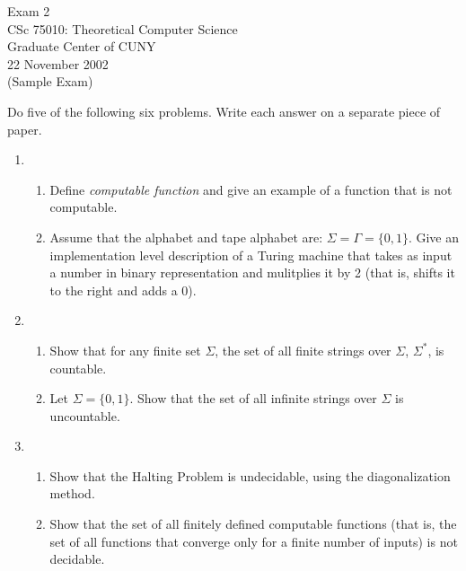 \documentclass[11pt]{article}
\begin{document}
\begin{center}
	Exam 2\\
        	CSc 75010: Theoretical Computer Science\\
        	Graduate Center of CUNY\\
	22 November 2002\\
        	(Sample Exam)
\end{center}

Do five of the following six problems.  Write each answer on a separate
piece of paper.


\begin{enumerate}
\item
\begin{enumerate}
	\item Define {\em computable function} and give an example of a function
		that is not computable.
	\item Assume that the alphabet and tape alphabet are: 
		$\Sigma = \Gamma = \{0,1\}$.
		Give an implementation level description of a Turing machine that
		takes as input a number in binary representation and mulitplies it
		by 2 (that is, shifts it to the right and adds a 0).

\end{enumerate}

\item 
\begin{enumerate}
	\item Show that for any finite set $\Sigma$, the set of all finite strings over $\Sigma$, 
		$\Sigma^*$, is countable.
	\item Let $\Sigma = \{0,1\}$.  Show that the set of all infinite strings over $\Sigma$ is 		uncountable.
	
\end{enumerate}
\item 
\begin{enumerate}
	\item Show that the Halting Problem is undecidable, using the diagonalization method.
	\item Show that the set of all finitely defined computable functions (that is, the set of 
		all functions that converge only for a finite number of inputs) is not decidable.
	

\end{enumerate}
\end{enumerate}
\end{document}
